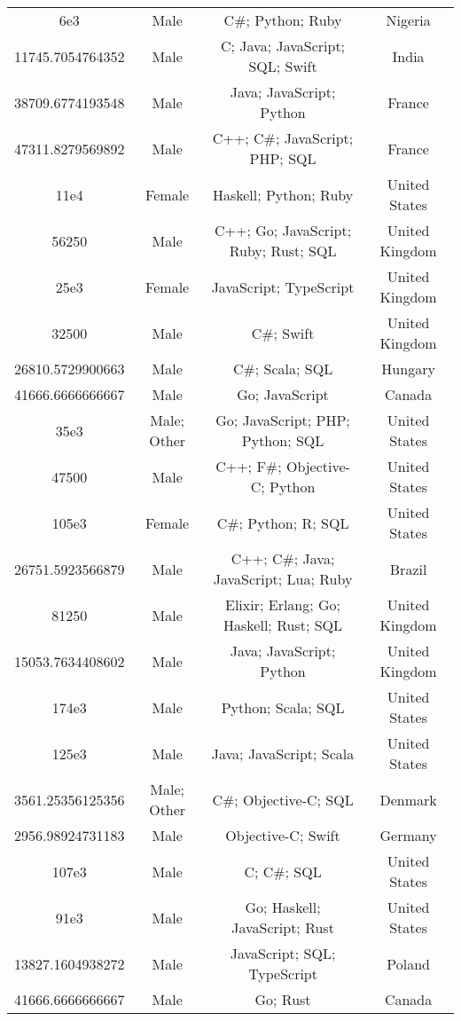 \begin{center}
\begin{tabular}{ |c|c|c|c| }
6e3  &  Male  &  C\#; Python; Ruby  &  Nigeria  \\ 
11745.7054764352  &  Male  &  C; Java; JavaScript; SQL; Swift  &  India  \\ 
38709.6774193548  &  Male  &  Java; JavaScript; Python  &  France  \\ 
47311.8279569892  &  Male  &  C++; C\#; JavaScript; PHP; SQL  &  France  \\ 
11e4  &  Female  &  Haskell; Python; Ruby  &  United States  \\ 
56250  &  Male  &  C++; Go; JavaScript; Ruby; Rust; SQL  &  United Kingdom  \\ 
25e3  &  Female  &  JavaScript; TypeScript  &  United Kingdom  \\ 
32500  &  Male  &  C\#; Swift  &  United Kingdom  \\ 
26810.5729900663  &  Male  &  C\#; Scala; SQL  &  Hungary  \\ 
41666.6666666667  &  Male  &  Go; JavaScript  &  Canada  \\ 
35e3  &  Male; Other  &  Go; JavaScript; PHP; Python; SQL  &  United States  \\ 
47500  &  Male  &  C++; F\#; Objective-C; Python  &  United States  \\ 
105e3  &  Female  &  C\#; Python; R; SQL  &  United States  \\ 
26751.5923566879  &  Male  &  C++; C\#; Java; JavaScript; Lua; Ruby  &  Brazil  \\ 
81250  &  Male  &  Elixir; Erlang; Go; Haskell; Rust; SQL  &  United Kingdom  \\ 
15053.7634408602  &  Male  &  Java; JavaScript; Python  &  United Kingdom  \\ 
174e3  &  Male  &  Python; Scala; SQL  &  United States  \\ 
125e3  &  Male  &  Java; JavaScript; Scala  &  United States  \\ 
3561.25356125356  &  Male; Other  &  C\#; Objective-C; SQL  &  Denmark  \\ 
2956.98924731183  &  Male  &  Objective-C; Swift  &  Germany  \\ 
107e3  &  Male  &  C; C\#; SQL  &  United States  \\ 
91e3  &  Male  &  Go; Haskell; JavaScript; Rust  &  United States  \\ 
13827.1604938272  &  Male  &  JavaScript; SQL; TypeScript  &  Poland  \\ 
41666.6666666667  &  Male  &  Go; Rust  &  Canada  \\ 

\end{tabular}
\end{center}

